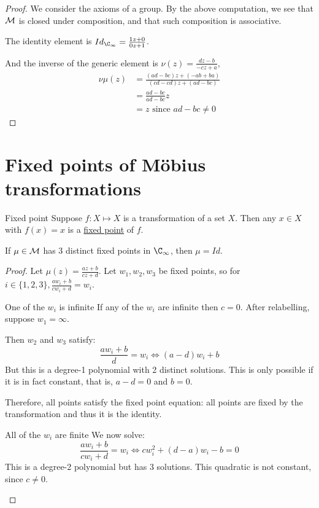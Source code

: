\documentclass[../Main.tex]{subfiles}
\begin{document}
\begin{proof}
    We consider the axioms of a group. By the above computation, we see that $\mathcal{M}$ is closed under composition, and that such composition is associative.\par
    The identity element is $Id_{\CInf} = \frac{1 z + 0}{0z + 1}$.\par
    And the inverse of the generic element is $\nu(z) = \frac{dz - b}{-cz + a}$,
    \begin{align*}
        \nu \mu(z) &= \frac{(ad-bc)z + (-ab + ba)}{(cd - cd)z + (ad - bc)} \\
        &= \frac{ad - bc}{ad - bc} z \\
        &= z \text{ since } ad - bc \neq 0
    \end{align*}
\end{proof}
\section{Fixed points of \texorpdfstring{M\"obius}{Mobius} transformations}
\begin{definition}{Fixed point}
    Suppose $f : X \mapsto X$ is a transformation of a set $X$. Then any $x \in X$ with $f(x) = x$ is a \underline{fixed point} of $f$.
\end{definition}
\begin{lemma}
    If $\mu \in \mathcal{M}$ has 3 distinct fixed points in $\CInf$, then $\mu = Id$.
    \label{lemMobius3Point}
\end{lemma}
\begin{proof}
    Let $\mu(z) = \frac{az + b}{cz + d}$. Let $w_1, w_2, w_3$ be fixed points, so for $i \in \{1, 2, 3\}, \frac{a w_i + b}{c w_i + d} = w_i$.
    \begin{case}{One of the $w_i$ is infinite}
        \label{caseInfiniteFixedPts}
        If any of the $w_i$ are infinite then $c = 0$. After relabelling, suppose $w_1 = \infty$.\par
        Then $w_2$ and $w_3$ satisfy:
        \begin{equation*}
            \frac{a w_i + b}{d} = w_i \Leftrightarrow (a-d) w_i + b
        \end{equation*}
        But this is a degree-1 polynomial with 2 distinct solutions. This is only possible if it is in fact constant, that is, $a - d = 0$ and $b = 0$.\par
        Therefore, all points satisfy the fixed point equation: all points are fixed by the transformation and thus it is the identity.
    \end{case}
    \begin{case}{All of the $w_i$ are finite}
        \label{caseFiniteFixedPts}
        We now solve:
        \begin{equation}
            \frac{a w_i + b}{c w_i + d} = w_i \Leftrightarrow c w_i^2 + (d - a) w_i - b = 0
            \label{eqnMobiusFixedPts}
        \end{equation}
        This is a degree-2 polynomial but has 3 solutions. This quadratic is not constant, since $c \neq 0$. \contradiction
    \end{case}
\end{proof}
\end{document}
